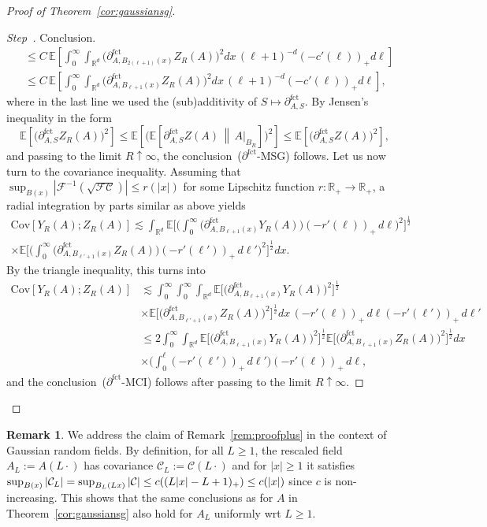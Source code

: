 \documentclass[10pt]{amsart}
\theoremstyle{definition}\newtheorem{defi}[theo]{Definition}\newtheorem{rema}[theo]{Remark}\newtheorem{exam}[theo]{Example}\newtheorem{exem}[theo]{Example}\newtheorem{nota}[theo]{Notation}
\newcommand{\R}{\mathbb R}
\newcommand{\E}{\mathbb{E}}
\newcommand{\expecM}[1]{\mathbb{E}\bigg[#1 \bigg]}
\newcommand{\expec}[1]{\mathbb{E}\left[#1 \right]}
\newcommand{\expeC}[2]{\mathbb{E}\left[\left. #1 \,\right\|\,#2\right]}
\newcommand{\Cc}{\mathcal C}
\newcommand{\F}{\mathcal F}
\newcommand{\parfct}[1]{\partial_{#1}^{\operatorname{fct}}}
\newcommand{\cov}[2]{\mathrm{Cov}\left[#1;#2\right]}
\newcounter{stepcount}
\newenvironment{step}{\refstepcounter{stepcount}\begin{proof}[Step~\thestepcount]}{\let\qed\relax\end{proof}}
\begin{document}
\begin{proof}[Proof of Theorem~\ref{cor:gaussiansg}]
\begin{step}{Conclusion.}
\begin{align*}
&\le C\,\E\left[\int_0^\infty \int_{\R^d}\Big(\parfct{A,B_{2(\ell+1)}(x)}Z_R(A)\Big)^2dx\,(\ell+1)^{-d}(-c'(\ell))_+d\ell\right]\\
&\le C\, \E\left[\int_0^\infty \int_{\R^d}\Big(\parfct{A,B_{\ell+1}(x)}Z_R(A)\Big)^2dx\,(\ell+1)^{-d}(-c'(\ell))_+d\ell\right],
\end{align*}
where in the last line we used the (sub)additivity of $S\mapsto\parfct{A,S}$. By Jensen's inequality in the form
\[
\expec{\Big(\parfct{A,S}Z_R(A)\Big)^2}\le\expec{\Big(\expeC{\parfct{A,S}Z(A)}{A|_{B_R}}\Big)^2}\le\expec{\Big(\parfct{A,S}Z(A)\Big)^2},
\]
and passing to the limit $R\uparrow\infty$, the conclusion~($\parfct{}$-MSG) follows. Let us now turn to the covariance inequality. Assuming that $\sup_{B(x)}|\F^{-1}(\sqrt{\F\Cc})|\le r(|x|)$ for some Lipschitz function $r:\R_+\to\R_+$, a radial integration by parts similar as above yields
\begin{multline*}
\cov {Y_R(A)}{Z_R(A)}\lesssim \int_{\R^d}\expecM{\bigg(\int_0^\infty \Big(\parfct{A,B_{\ell+1}(x)}Y_R(A)\Big)(-r'(\ell))_+\,d\ell\bigg)^2}^\frac12\\
\times\expecM{\bigg(\int_0^\infty \Big(\parfct{A,B_{\ell'+1}(x)}Z_R(A)\Big)(-r'(\ell'))_+\,d\ell'\bigg)^2}^\frac12 dx.
\end{multline*}
By the triangle inequality, this turns into
\begin{align*}
\cov {Y_R(A)}{Z_R(A)}&\lesssim \int_0^\infty\int_0^\infty\int_{\R^d}\expecM{\Big(\parfct{A,B_{\ell+1}(x)}Y_R(A)\Big)^2}^\frac12\\
&\times\expecM{\Big(\parfct{A,B_{\ell'+1}(x)}Z_R(A)\Big)^2}^\frac12 dx\,(-r'(\ell))_+\,d\ell(-r'(\ell'))_+\,d\ell'\\
&\le2\int_0^\infty\int_{\R^d}\expecM{\Big(\parfct{A,B_{\ell+1}(x)}Y_R(A)\Big)^2}^\frac12\expecM{\Big(\parfct{A,B_{\ell+1}(x)}Z_R(A)\Big)^2}^\frac12dx\\
&\times \Big(\int_0^\ell(-r'(\ell'))_+\,d\ell'\Big)(-r'(\ell))_+\,d\ell,
\end{align*}
and the conclusion~($\parfct{}$-MCI) follows after passing to the limit $R\uparrow\infty$.
\end{step}
\end{proof}

\begin{rema}\label{rem:rescale-2}
We address the claim of Remark~\ref{rem:proofplus} in the context of Gaussian random fields. By definition, for all $L\ge1$, the rescaled field $A_L:=A(L\cdot)$ has covariance $\Cc_L:=\Cc(L\cdot)$ and for $|x|\ge1$ it satisfies $\sup_{B(x)}|\Cc_L|=\sup_{B_L(Lx)}|\Cc|\linebreak\le c((L|x|-L+1)_+)\le c(|x|)$ since $c$ is non-increasing. This shows that the same conclusions as for $A$ in Theorem~\ref{cor:gaussiansg} also hold for $A_L$ uniformly wrt $L\ge1$.
\end{rema}
\end{document}
